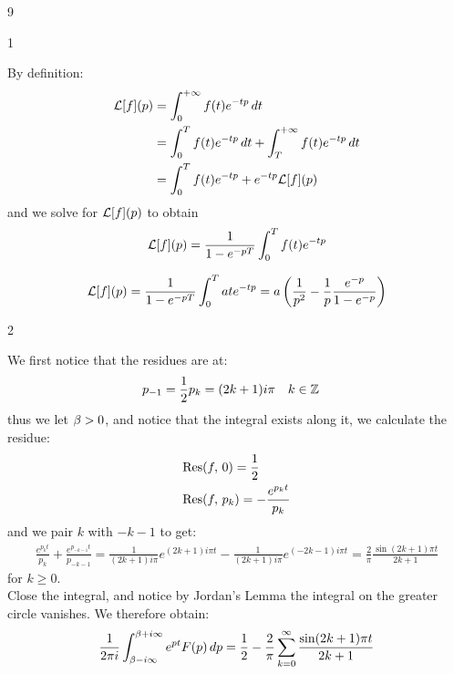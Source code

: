 

\begin{vv286}{9}
  \begin{vv286_mp}{1}
  \item[(i)]
    By definition:
    \begin{align*}
      {\mathcal{L}}[f](p)&=\int_{0}^{+\infty}f(t)e^{-tp}\, dt\\
      &=\int_0^{T}f(t)e^{-tp}\, dt+\int_{T}^{+\infty}f(t)e^{-tp}\, dt\\
      &=\int_0^{T}f(t)e^{-tp}+e^{-tp}\mathcal{L}[f](p)
    \end{align*}
    and we solve for $\mathcal{L}[f](p)$ to obtain
    \begin{equation*}
      \mathcal{L}[f](p)=\frac{1}{1-e^{-pT}}\int_0^{T}f(t)e^{-tp}
    \end{equation*}
   \item[(ii)]
     \begin{align*}
       \mathcal{L}[f](p)=\frac{1}{1-e^{-pT}}\int_0^{T}ate^{-tp}=a\left(\frac{1}{p^2}-\frac{1}{p}\frac{e^{-p}}{1-e^{-p}}\right)
     \end{align*}
  \end{vv286_mp}
  \begin{vv286_mp}{2}
  \item[(i)]
    We first notice that the residues are at:
    \begin{align*}
      p_{-1}=\frac{1}{2}&
      p_{k}=(2k+1)i\pi\quad k\in\mathbb{Z}
    \end{align*}
    thus we let $\beta>0$, and notice that the integral exists along it, we
    calculate the residue:
   \begin{align*}
     &\hbox{$\mathop{\rm Res}(f,\,0)$}=\frac{1}{2}\\
     &\hbox{$\mathop{\rm Res}(f,\,p_k)$}=-\frac{e^{p_kt}}{p_k}
   \end{align*}
   and we pair $k$ with $-k-1$ to get:
   \begin{align*}
     \frac{e^{p_kt}}{p_k}+\frac{e^{p_{-k-1}t}}{p_{-k-1}}=
     \frac{1}{(2k+1)i\pi}e^{(2k+1)i\pi t}-\frac{1}{(2k+1)i\pi}e^{(-2k-1)i\pi
     t}
     =\frac{2}{\pi}\frac{\sin (2k+1)\pi t}{2k+1}
   \end{align*}
   for $k\ge0$.\\
   Close the integral, and notice by Jordan's Lemma the integral on the
   greater circle vanishes. We therefore obtain:
   \begin{align*}
     \frac{1}{2\pi i}\int_{\beta-i\infty}^{\beta+i\infty}e^{pt}F(p)\, dp=
     \frac{1}{2}-\frac{2}{\pi}\sum_{k=0}^{\infty}\frac{\sin (2k+1)\pi t}{2k+1}
   \end{align*}

\end{vv286_mp}
\end{vv286}
